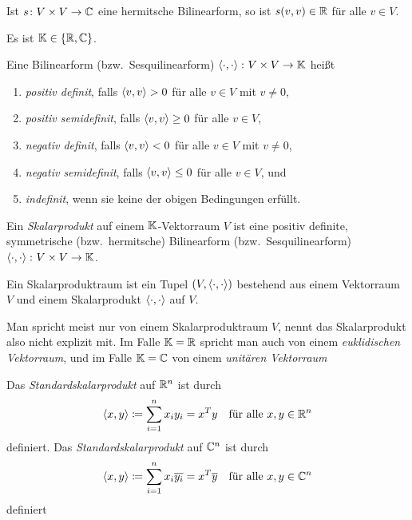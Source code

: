 \begin{lemma}
  Ist $s \colon V \times V \to \mathbb{C}$ eine hermitsche Bilinearform, so ist $s(v,v) \in \mathbb{R}$ für alle $v \in V$.
\end{lemma}


\begin{notation}
  Es ist $\mathbb{K} \in \{\mathbb{R}, \mathbb{C}\}$.
\end{notation}


\begin{definition}
  Eine Bilinearform (bzw.\ Sesquilinearform) $\left\langle \cdot, \cdot \right\rangle \colon V \times V \to \mathbb{K}$ heißt
  \begin{enumerate}[leftmargin=*, label=\roman*)]
    \item
      \emph{positiv definit}, falls $\left\langle v,v \right\rangle > 0$ für alle $v \in V$ mit $v \neq 0$,
    \item
      \emph{positiv semidefinit}, falls $\left\langle v,v \right\rangle \geq 0$ für alle $v \in V$,
    \item
      \emph{negativ definit}, falls $\left\langle v,v \right\rangle < 0$ für alle $v \in V$ mit $v \neq 0$,
    \item
      \emph{negativ semidefinit}, falls $\left\langle v,v \right\rangle \leq 0$ für alle $v \in V$, und
    \item
      \emph{indefinit}, wenn sie keine der obigen Bedingungen erfüllt.
  \end{enumerate}
\end{definition}


\begin{definition}
  Ein \emph{Skalarprodukt} auf einem $\mathbb{K}$-Vektorraum $V$ ist eine positiv definite, symmetrische (bzw.\ hermitsche) Bilinearform (bzw.\ Sesquilinearform) $\left\langle \cdot, \cdot \right\rangle \colon V \times V \to \mathbb{K}$.
  
  Ein Skalarproduktraum ist ein Tupel $(V, \left\langle \cdot, \cdot \right\rangle)$ bestehend aus einem Vektorraum $V$ und einem Skalarprodukt $\left\langle \cdot, \cdot \right\rangle$ auf $V$.
\end{definition}


\begin{remark}
  Man spricht meist nur von einem Skalarproduktraum $V$, nennt das Skalarprodukt also nicht explizit mit.
  Im Falle $\mathbb{K} = \mathbb{R}$ spricht man auch von einem \emph{euklidischen Vektorraum}, und im Falle $\mathbb{K} = \mathbb{C}$ von einem \emph{unitären Vektorraum}
\end{remark}


\begin{example}
  Das \emph{Standardskalarprodukt} auf $\mathbb{R}^n$ ist durch
  \[
              \left\langle x, y \right\rangle
    \coloneqq \sum_{i=1}^n x_i y_i = x^T y
    \quad
    \text{für alle $x, y \in \mathbb{R}^n$}
  \]
  definiert. Das \emph{Standardskalarprodukt} auf $\mathbb{C}^n$ ist durch
  \[
              \left\langle x, y \right\rangle
    \coloneqq \sum_{i=1}^n x_i \overline{y_i} = x^T \overline{y}
    \quad
    \text{für alle $x, y \in \mathbb{C}^n$}
  \]
  definiert
\end{example}


